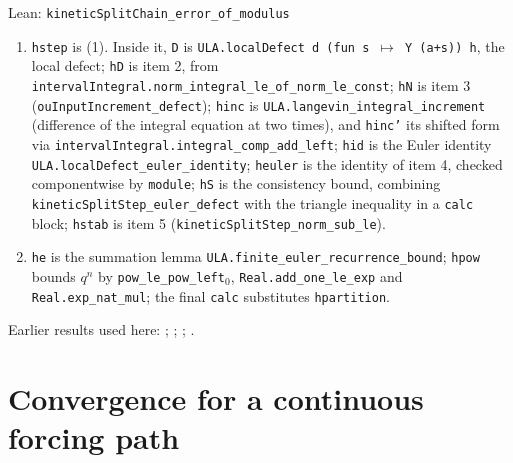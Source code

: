 \documentclass[11pt,a4paper]{article}
\begin{document}
\begin{leanbox}{Lean: \texttt{kineticSplitChain\_\allowbreak{}error\_\allowbreak{}of\_\allowbreak{}modulus}}
\begin{enumerate}
\item \texttt{hstep} is (1). Inside it, \texttt{D} is \texttt{ULA.\allowbreak{}local\allowbreak{}Defect d (fun s \ensuremath{\mapsto} Y (a+s)) h}, the local defect; \texttt{h\allowbreak{}D} is item 2, from \texttt{interval\allowbreak{}Integral.\allowbreak{}norm\_\allowbreak{}integral\_\allowbreak{}le\_\allowbreak{}of\_\allowbreak{}norm\_\allowbreak{}le\_\allowbreak{}const}; \texttt{h\allowbreak{}N} is item 3 (\texttt{ou\allowbreak{}Input\allowbreak{}Increment\_\allowbreak{}defect}); \texttt{hinc} is \texttt{ULA.\allowbreak{}langevin\_\allowbreak{}integral\_\allowbreak{}increment} (difference of the integral equation at two times), and \texttt{hinc'} its shifted form via \texttt{interval\allowbreak{}Integral.\allowbreak{}integral\_\allowbreak{}comp\_\allowbreak{}add\_\allowbreak{}left}; \texttt{hid} is the Euler identity \texttt{ULA.\allowbreak{}local\allowbreak{}Defect\_\allowbreak{}euler\_\allowbreak{}identity}; \texttt{heuler} is the identity of item 4, checked componentwise by \texttt{module}; \texttt{h\allowbreak{}S} is the consistency bound, combining \texttt{kinetic\allowbreak{}Split\allowbreak{}Step\_\allowbreak{}euler\_\allowbreak{}defect} with the triangle inequality in a \texttt{calc} block; \texttt{hstab} is item 5 (\texttt{kinetic\allowbreak{}Split\allowbreak{}Step\_\allowbreak{}norm\_\allowbreak{}sub\_\allowbreak{}le}).

\item \texttt{he} is the summation lemma \texttt{ULA.\allowbreak{}finite\_\allowbreak{}euler\_\allowbreak{}recurrence\_\allowbreak{}bound}; \texttt{hpow} bounds \(q^n\) by \texttt{pow\_\allowbreak{}le\_\allowbreak{}pow\_\allowbreak{}left\ensuremath{{}_{0}}}, \texttt{Real.\allowbreak{}add\_\allowbreak{}one\_\allowbreak{}le\_\allowbreak{}exp} and \texttt{Real.\allowbreak{}exp\_\allowbreak{}nat\_\allowbreak{}mul}; the final \texttt{calc} substitutes \texttt{hpartition}.

\end{enumerate}
\end{leanbox}


Earlier results used here: \cite[Section~3.11.1]{LangevinLean2026ULASC}; \cite[Section~3.11.3]{LangevinLean2026ULASC}; \cite[Section~3.16.4]{LangevinLean2026ULASC}; \cite[Section~3.16.5]{LangevinLean2026ULASC}.

\section{\texorpdfstring{Convergence for a continuous forcing path}{Convergence for a continuous forcing path}}
\end{document}
